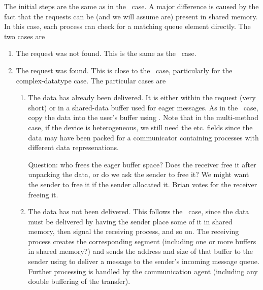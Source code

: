 
The initial steps are the same as in the \tcpname\ case.  A major difference
is caused by the fact that the requests can be (and we will assume are)
present in shared memory.  In this case, each process can check for a matching
queue element directly. The two cases are
\begin{enumerate}
\item The request was not found.  This is the same as the \tcpname\ case.
\item The request was found.  This is close to the \tcpname\ case,
  particularly for the complex-datatype case.  The particular cases are
  \begin{enumerate}
  \item The data has already been delivered.  It is either within the request
    (very short) or in a shared-data buffer used for eager messages.  As in
    the \tcpname\ case, copy the data into the user's buffer using
    .  Note that in the multi-method case, if the device
    is heterogeneous, we still need the  etc. fields
    since the data may have been packed for a communicator containing
    processes with different data represenations.

    Question: who frees the eager buffer space?  Does the receiver free it
    after unpacking the data, or do we ask the sender to free it?  We might
    want the sender to free it if the sender allocated it.  Brian votes for
    the receiver freeing it.  

  \item The data has not been delivered.  This follows the \tcpname\ case,
    since the data must be delivered by having the sender place some of it in
    shared memory, then signal the receiving process, and so on.  The
    receiving process creates the corresponding segment (including one or more
    buffers in shared memory?) and sends the address and size of that buffer
    to the sender using  to deliver a message to the
    sender's incoming message queue.  Further processing is handled by the
    communication agent (including any double buffering of the transfer).
  \end{enumerate}
\end{enumerate}



